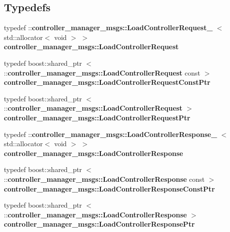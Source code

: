 \subsection*{\-Typedefs}
\begin{DoxyCompactItemize}
\item 
typedef \*
\-::{\bf controller\-\_\-manager\-\_\-msgs\-::\-Load\-Controller\-Request\-\_\-}\*
$<$ std\-::allocator$<$ void $>$ $>$ {\bf controller\-\_\-manager\-\_\-msgs\-::\-Load\-Controller\-Request}
\item 
typedef boost\-::shared\-\_\-ptr\*
$<$ \-::{\bf controller\-\_\-manager\-\_\-msgs\-::\-Load\-Controller\-Request} \*
const  $>$ {\bf controller\-\_\-manager\-\_\-msgs\-::\-Load\-Controller\-Request\-Const\-Ptr}
\item 
typedef boost\-::shared\-\_\-ptr\*
$<$ \-::{\bf controller\-\_\-manager\-\_\-msgs\-::\-Load\-Controller\-Request} $>$ {\bf controller\-\_\-manager\-\_\-msgs\-::\-Load\-Controller\-Request\-Ptr}
\item 
typedef \*
\-::{\bf controller\-\_\-manager\-\_\-msgs\-::\-Load\-Controller\-Response\-\_\-}\*
$<$ std\-::allocator$<$ void $>$ $>$ {\bf controller\-\_\-manager\-\_\-msgs\-::\-Load\-Controller\-Response}
\item 
typedef boost\-::shared\-\_\-ptr\*
$<$ \-::{\bf controller\-\_\-manager\-\_\-msgs\-::\-Load\-Controller\-Response} \*
const  $>$ {\bf controller\-\_\-manager\-\_\-msgs\-::\-Load\-Controller\-Response\-Const\-Ptr}
\item 
typedef boost\-::shared\-\_\-ptr\*
$<$ \-::{\bf controller\-\_\-manager\-\_\-msgs\-::\-Load\-Controller\-Response} $>$ {\bf controller\-\_\-manager\-\_\-msgs\-::\-Load\-Controller\-Response\-Ptr}
\end{DoxyCompactItemize}
